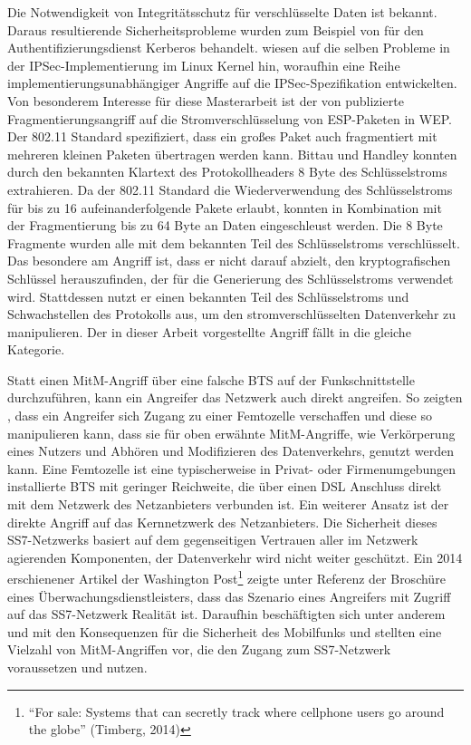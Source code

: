 Die Notwendigkeit von Integritätsschutz für verschlüsselte Daten ist bekannt. Daraus resultierende Sicherheitsprobleme wurden zum Beispiel von \citet{yu2004perils} für den Authentifizierungsdienst Kerberos behandelt. \citet{paterson2006cryptography} wiesen auf die selben Probleme in der \ac{IPSec}-Implementierung im Linux Kernel hin, woraufhin \citet{degabriele2007attacking} eine Reihe implementierungsunabhängiger Angriffe auf die \ac{IPSec}-Spezifikation entwickelten. Von besonderem Interesse für diese Masterarbeit ist der von \citet{bittau2006final} publizierte Fragmentierungsangriff auf die Stromverschlüsselung von \ac{ESP}-Paketen in \ac{WEP}. Der 802.11 Standard spezifiziert, dass ein großes Paket auch fragmentiert mit mehreren kleinen Paketen übertragen werden kann. Bittau und Handley konnten durch den bekannten Klartext des Protokollheaders 8 Byte des Schlüsselstroms extrahieren. Da der 802.11 Standard die Wiederverwendung des Schlüsselstroms für bis zu 16 aufeinanderfolgende Pakete erlaubt, konnten in Kombination mit der Fragmentierung bis zu 64 Byte an Daten eingeschleust werden. Die 8 Byte Fragmente wurden alle mit dem bekannten Teil des Schlüsselstroms verschlüsselt. Das besondere am Angriff ist, dass er nicht darauf abzielt, den kryptografischen Schlüssel herauszufinden, der für die Generierung des Schlüsselstroms verwendet wird. Stattdessen nutzt er einen bekannten Teil des Schlüsselstroms und Schwachstellen des Protokolls aus, um den stromverschlüsselten Datenverkehr zu manipulieren. Der in dieser Arbeit vorgestellte Angriff fällt in die gleiche Kategorie.

Statt einen \ac{MitM}-Angriff über eine falsche \ac{BTS} auf der Funkschnittstelle durchzuführen, kann ein Angreifer das Netzwerk auch direkt angreifen. So zeigten \citet{golde2012weaponizing}, dass ein Angreifer sich Zugang zu einer Femtozelle verschaffen und diese so manipulieren kann, dass sie für oben erwähnte \ac{MitM}-Angriffe, wie Verkörperung eines Nutzers und Abhören und Modifizieren des Datenverkehrs, genutzt werden kann. Eine Femtozelle ist eine typischerweise in Privat- oder Firmenumgebungen installierte \ac{BTS} mit geringer Reichweite, die über einen \ac{DSL} Anschluss direkt mit dem Netzwerk des Netzanbieters verbunden ist. Ein weiterer Ansatz ist der direkte Angriff auf das Kernnetzwerk des Netzanbieters. Die Sicherheit dieses \ac{SS7}-Netzwerks basiert auf dem gegenseitigen Vertrauen aller im Netzwerk agierenden Komponenten, der Datenverkehr wird nicht weiter geschützt. Ein 2014 erschienener Artikel der Washington Post\footnote{"`For sale: Systems that can secretly track where cellphone users go around the globe"' (Timberg,
2014)} zeigte unter Referenz der Broschüre eines Überwachungsdienstleisters, dass das Szenario eines Angreifers mit Zugriff auf das \ac{SS7}-Netzwerk Realität ist. Daraufhin beschäftigten sich unter anderem \citet{nohl2014mobile} und \citet{Mourad:fall-of-ss7} mit den Konsequenzen für die Sicherheit des Mobilfunks und stellten eine Vielzahl von \ac{MitM}-Angriffen vor, die den Zugang zum \ac{SS7}-Netzwerk voraussetzen und nutzen.

